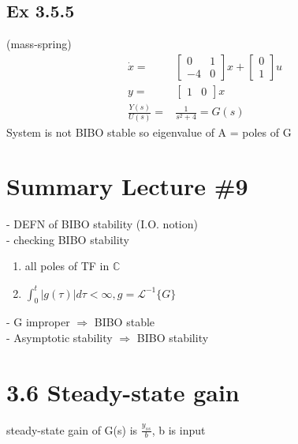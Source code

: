 \documentclass[letterpaper]{article}
\begin{document}
\subsection*{Ex 3.5.5} (mass-spring)
\begin{align*}
	\dot x= & \begin{bmatrix}0 & 1 \\-4&0\end{bmatrix}x+\begin{bmatrix}0\\1\end{bmatrix}u\\
	y=&\begin{bmatrix}1&0\end{bmatrix}x\\
	\frac{Y(s)}{U(s)}=&\frac{1}{s^2+4}=G(s)
\end{align*}
System is not BIBO stable
so eigenvalue of A = poles of G

\section*{Summary Lecture \#9}		    
- DEFN of BIBO stability (I.O. notion)\\
- checking BIBO stability \\
\begin{enumerate}
	\item all poles of TF in $\mathbb{C}$
	\item $\int_{0}^t |g(\tau)|d\tau < \infty, g=\mathscr{L}^{-1}\{G\}$ 
\end{enumerate}
- G improper $\Rightarrow$ BIBO stable\\
- Asymptotic stability $\Rightarrow$ BIBO stability\\

\section*{3.6 Steady-state gain}
steady-state gain of G(s) is $\frac{y_{ss}}{b}$, b is input\\
\end{document}
